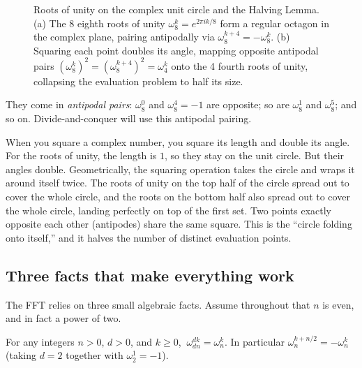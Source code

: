 \begin{figure}[H]
\caption{Roots of unity on the complex unit circle and the Halving Lemma. (a)
The 8 eighth roots of unity $\omega_8^k = e^{2\pi i k / 8}$ form a regular
octagon in the complex plane, pairing antipodally via $\omega_8^{k+4} = -\omega_8^k$.
(b) Squaring each point doubles its angle, mapping opposite antipodal pairs
$(\omega_8^k)^2 = (\omega_8^{k+4})^2 = \omega_4^k$ onto the 4 fourth roots of unity,
collapsing the evaluation problem to half its size.}
\label{ch29:fig-roots-of-unity}
\end{figure}

They come in \emph{antipodal pairs}: $\omega_8^0$ and $\omega_8^4=-1$ are opposite;
so are $\omega_8^1$ and $\omega_8^5$; and so on. Divide-and-conquer will
use this antipodal pairing.

\begin{intuitionbox}
When you square a complex number, you square its length and double its angle. For the roots of unity, the length is $1$, so they stay on the unit circle. But their angles double. Geometrically, the squaring operation takes the circle and wraps it around itself twice. The roots of unity on the top half of the circle spread out to cover the whole circle, and the roots on the bottom half also spread out to cover the whole circle, landing perfectly on top of the first set. Two points exactly opposite each other (antipodes) share the same square. This is the ``circle folding onto itself,'' and it halves the number of distinct evaluation points.
\end{intuitionbox}

\subsection{Three facts that make everything work}

The FFT relies on three small algebraic facts. Assume throughout that
$n$ is even, and in fact a power of two.

\begin{lemma}[Cancellation]\label{ch29:cancel}
For any integers $n>0$, $d>0$, and $k\ge 0$, $\ \omega_{dn}^{dk} = \omega_n^{k}.$
In particular $\omega_n^{k+n/2} = -\omega_n^{k}$ (taking $d=2$ together with
$\omega_2^1 = -1$).
\end{lemma}

